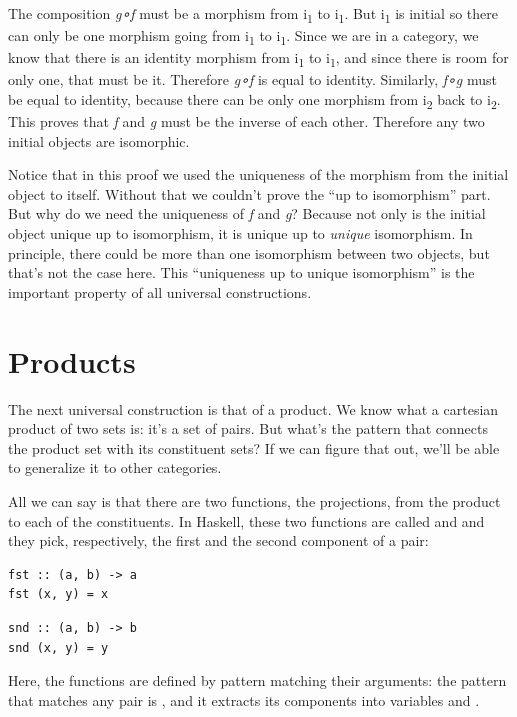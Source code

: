 \noindent
The composition \emph{g∘f} must be a morphism from i\textsubscript{1} to
i\textsubscript{1}. But i\textsubscript{1} is initial so there can only
be one morphism going from i\textsubscript{1} to i\textsubscript{1}.
Since we are in a category, we know that there is an identity morphism
from i\textsubscript{1} to i\textsubscript{1}, and since there is room
for only one, that must be it. Therefore \emph{g∘f} is equal to
identity. Similarly, \emph{f∘g} must be equal to identity, because there
can be only one morphism from i\textsubscript{2} back to
i\textsubscript{2}. This proves that \emph{f} and \emph{g} must be the
inverse of each other. Therefore any two initial objects are isomorphic.

Notice that in this proof we used the uniqueness of the morphism from
the initial object to itself. Without that we couldn't prove the ``up to
isomorphism'' part. But why do we need the uniqueness of \emph{f} and
\emph{g}? Because not only is the initial object unique up to
isomorphism, it is unique up to \emph{unique} isomorphism. In principle,
there could be more than one isomorphism between two objects, but that's
not the case here. This ``uniqueness up to unique isomorphism'' is the
important property of all universal constructions.

\section{Products}\label{products}

The next universal construction is that of a product. We know what a
cartesian product of two sets is: it's a set of pairs. But what's the
pattern that connects the product set with its constituent sets? If we
can figure that out, we'll be able to generalize it to other categories.

All we can say is that there are two functions, the projections, from
the product to each of the constituents. In Haskell, these two functions
are called  and  and they pick, respectively,
the first and the second component of a pair:

\begin{verbatim}
fst :: (a, b) -> a
fst (x, y) = x
\end{verbatim}

\begin{verbatim}
snd :: (a, b) -> b
snd (x, y) = y
\end{verbatim}
Here, the functions are defined by pattern matching their arguments: the
pattern that matches any pair is , and it extracts its
components into variables  and .

